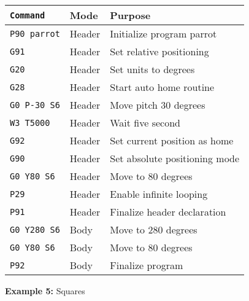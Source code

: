 \begin{tabular}{lll}
  \hline
  \texttt{Command}    & Mode   & Purpose                       \\
  \hline
  \texttt{P90 parrot} & Header & Initialize program parrot     \\
  \texttt{G91}        & Header & Set relative positioning      \\
  \texttt{G20}        & Header & Set units to degrees          \\
  \texttt{G28}        & Header & Start auto home routine       \\
  \texttt{G0 P-30 S6} & Header & Move pitch 30 degrees         \\
  \texttt{W3 T5000}   & Header & Wait five second              \\
  \texttt{G92}        & Header & Set current position as home  \\
  \texttt{G90}        & Header & Set absolute positioning mode \\
  \texttt{G0 Y80 S6}  & Header & Move to 80 degrees            \\
  \texttt{P29}        & Header & Enable infinite looping       \\
  \texttt{P91}        & Header & Finalize header declaration   \\
  \texttt{G0 Y280 S6} & Body & Move to 280 degrees           \\
  \texttt{G0 Y80 S6}  & Body & Move to 80 degrees            \\
  \texttt{P92}        & Body   & Finalize program              \\
  \hline
\end{tabular}

\vspace{0.3cm}
\noindent
\textbf{Example 5:} Squares


